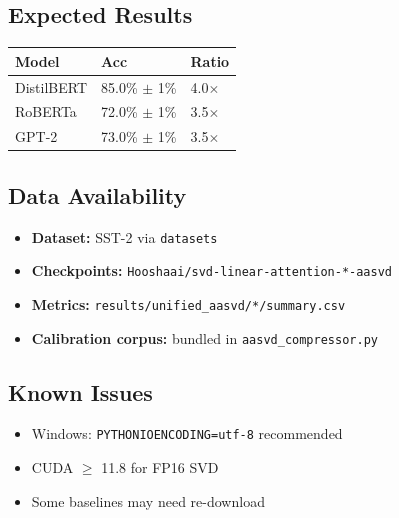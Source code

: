 \subsection{Expected Results}

\begin{table}[H]
\centering
\small
\begin{tabular}{lll}
\toprule
\textbf{Model} & \textbf{Acc} & \textbf{Ratio} \\
\midrule
DistilBERT & 85.0\% $\pm$ 1\% & 4.0$\times$ \\
RoBERTa & 72.0\% $\pm$ 1\% & 3.5$\times$ \\
GPT-2 & 73.0\% $\pm$ 1\% & 3.5$\times$ \\
\bottomrule
\end{tabular}
\end{table}

\subsection{Data Availability}

\begin{itemize}
\item \textbf{Dataset:} SST-2 via \texttt{datasets}
\item \textbf{Checkpoints:} \texttt{Hooshaai/svd-linear-attention-*-aasvd}
\item \textbf{Metrics:} \texttt{results/unified\_aasvd/*/summary.csv}
\item \textbf{Calibration corpus:} bundled in \texttt{aasvd\_compressor.py}

\end{itemize}
\subsection{Known Issues}

\begin{itemize}
\item Windows: \texttt{PYTHONIOENCODING=utf-8} recommended
\item CUDA $\ge$ 11.8 for FP16 SVD
\item Some baselines may need re-download
\end{itemize}